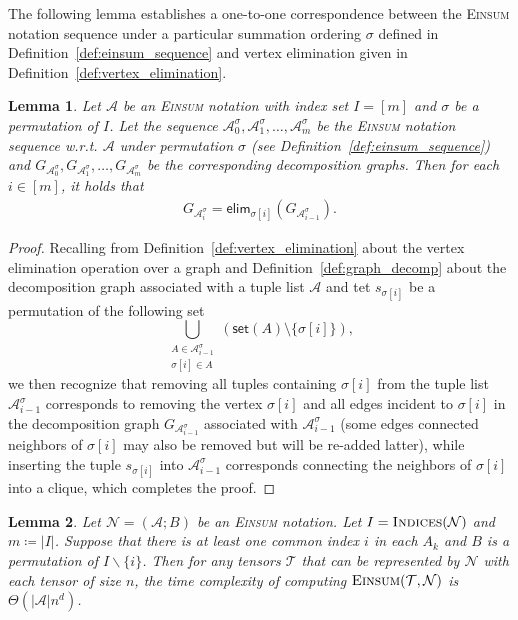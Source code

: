 \documentclass[12pt]{article}
\theoremstyle{plain}
\newtheorem{lemma}{Lemma}
\theoremstyle{definition}
\def\Einsum{\textsc{Einsum}}
\newcommand{\takesetp}[1]{\mathsf{set}(#1)}
\newcommand{\indexset}{\textsc{Indices}}
\newcommand{\tensorcontraction}{\textsc{Einsum}}
\newcommand{\graphform}[1]{G_{#1}}
\newcommand{\appequal}{\Theta}
\newcommand{\eliminatevg}[2]{\mathsf{elim}_{#1}(#2)}
\def\calA{\mathcal{A}}
\def\calT{\mathcal{T}}
\def\calN{\mathcal{N}}
\begin{document}
\begin{bibunit}[agsm]
The following lemma establishes a one-to-one correspondence between the \Einsum{} notation sequence under a particular summation ordering $\sigma$ defined in Definition~\ref{def:einsum_sequence} and vertex elimination given in Definition~\ref{def:vertex_elimination}.

\begin{lemma}
\label{lem:einsum_graph_seq}
Let $\calA$ be an \Einsum{} notation with index set $I = [m]$ and $\sigma$ be a permutation of $I$. Let the sequence $\calA^{\sigma}_0, \calA^{\sigma}_1, \ldots, \calA^{\sigma}_m$ be the \Einsum{} notation sequence w.r.t. $\calA$ under permutation $\sigma$ (see Definition~\ref{def:einsum_sequence}) and $\graphform{\calA^{\sigma}_0}, \graphform{\calA^{\sigma}_1}, \ldots, \graphform{\calA^{\sigma}_m}$ be the corresponding decomposition graphs. Then for each $i \in [m]$, it holds that
\begin{align*}
   \graphform{\calA^{\sigma}_i} = \eliminatevg{\sigma[i]}{\graphform{\calA^{\sigma}_{i-1}}}.
\end{align*}
\end{lemma}

\begin{proof}
Recalling from Definition~\ref{def:vertex_elimination} about the vertex elimination operation over a graph and Definition~\ref{def:graph_decomp} about the decomposition graph associated with a tuple list $\calA$ and tet $s_{\sigma[i]}$ be a permutation of the following set 
\begin{equation*}
    \bigcup_{\substack{ A \in \calA^{\sigma}_{i-1} \\ \sigma[i] \in A}} (\takesetp{A} \setminus \{\sigma[i]\}), 
\end{equation*}
we then recognize that removing all tuples containing $\sigma[i]$ from the tuple list $\calA^{\sigma}_{i - 1}$ corresponds to removing the vertex $\sigma[i]$ and all edges incident to $\sigma[i]$ in the decomposition graph $\graphform{\calA^{\sigma}_{i-1}}$ associated with $\calA^{\sigma}_{i-1}$ (some edges connected neighbors of $\sigma[i]$ may also be removed but will be re-added latter), while inserting the tuple $s_{\sigma[i]}$ into $\calA^{\sigma}_{i-1}$ corresponds connecting the neighbors of $\sigma[i]$ into a clique, which completes the proof. 
\end{proof}

\begin{lemma}
\label{lem:complexity_one_index}
Let $\calN = (\calA; B)$ be an \Einsum{} notation. Let $I = \indexset(\calN)$ and $m \coloneqq |I|$. Suppose that there is at least one common index $i$ in each $A_k$ and $B$ is a permutation of $I \backslash \{i\}$. Then for any tensors $\calT$ that can be represented by $\calN$ with each tensor of size $n$, the time complexity of computing $\tensorcontraction(\calT, \calN)$ is $\appequal(|\calA|n^{d})$.
\end{lemma}


\end{bibunit}
\end{document}
